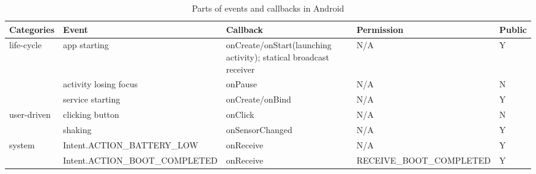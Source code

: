\begin{itemize}
    
\end{itemize}


\begin{table*}[t]
\centering
 \caption{\label{tab:events}Parts of events and callbacks in Android}
 \begin{tabularx}{\linewidth}{XXXXX} 
  \toprule
  Categories & Event & Callback & Permission & Public \\
  \midrule
  life-cycle & app starting & onCreate/onStart(launching activity); statical broadcast receiver & N/A & Y\\
             & activity losing focus & onPause & N/A & N\\
             & service starting & onCreate/onBind & N/A & Y\\
             
  user-driven & clicking button & onClick & N/A & N\\
              & shaking & onSensorChanged & N/A & Y\\
              
  system  & Intent.ACTION\_BATTERY\_LOW & onReceive & N/A & Y \\
          & Intent.ACTION\_BOOT\_COMPLETED & onReceive & RECEIVE\_BOOT\_COMPLETED & Y \\
  
  \bottomrule
 \end{tabularx}
\end{table*}

